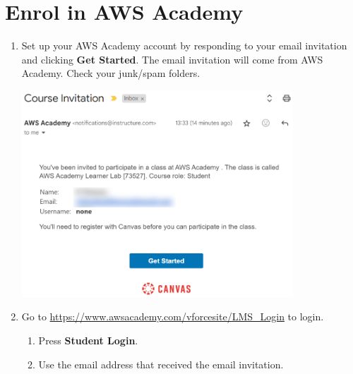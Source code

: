 \documentclass{csse4400}
\begin{document}
\section{Enrol in AWS Academy}

\begin{enumerate}
    \item
        Set up your AWS Academy account by responding to your email invitation and clicking \textbf{Get Started}.
        The email invitation will come from AWS Academy.
        Check your junk/spam folders.

        \includegraphics[width=0.8\textwidth]{images/email-invite}

    \item Go to \url{https://www.awsacademy.com/vforcesite/LMS_Login} to login.
    \begin{enumerate}
        \item Press \textbf{Student Login}.
        \item Use the email address that received the email invitation.
    \end{enumerate}


\end{enumerate}
\end{document}
